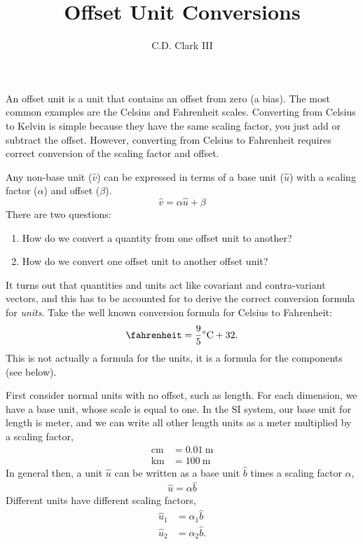 \documentclass[letterpaper,10pt]{article}
\title{Offset Unit Conversions}
\author{C.D. Clark III}
\begin{document}
\maketitle

An offset unit is a unit that contains an offset from zero (a bias). The most common examples are the Celsius and Fahrenheit
scales. Converting from Celsius to Kelvin is simple because they have the same
scaling factor, you just add or subtract the offset. However, converting from
Celsius to Fahrenheit requires correct conversion of the scaling factor and offset.

Any non-base unit ($\hat{v}$) can be expressed in terms of a base unit ($\hat{u}$) with a scaling factor ($\alpha$) and offset ($\beta$).
$$
\label{eq:offset_unit}
\hat{v} = \alpha \hat{u} + \beta
$$
There are two questions:
\begin{enumerate}
        \item How do we convert a quantity from one offset unit to another?
        \item How do we convert one offset unit to another offset unit?
\end{enumerate}

It turns out that quantities and units act like covariant and contra-variant vectors, and this has to be
accounted for to derive the correct conversion formula for \emph{units}.
Take the well known conversion formula for Celsius to Fahrenheit:
$$
\label{eq:cel_to_far}
\si{\fahrenheit} = \frac{9}{5} \si{\celsius} + 32.
$$
This is not actually a formula for the units, it is a formula for the components (see below).

First consider normal units with no offset, such as length. For each dimension, we have a base unit, whose scale is equal to one. In the SI system,
our base unit for length is meter, and we can write all other length units as a meter multiplied by a scaling factor,
\begin{align*}
        \si{\centi\meter} &= \SI{0.01}{\meter} \\
        \si{\kilo\meter} &= \SI{100}{\meter}
\end{align*}
In general then, a unit $\hat{u}$ can be written as a base unit $\hat{b}$ times a scaling factor $\alpha$,
\begin{align}
        \hat{u} = \alpha\hat{b}
\end{align}
Different units have different scaling factors,
\begin{align}
        \hat{u}_1 &= \alpha_1\hat{b} \\
        \hat{u}_2 &= \alpha_2\hat{b}.
\end{align}
\end{document}
